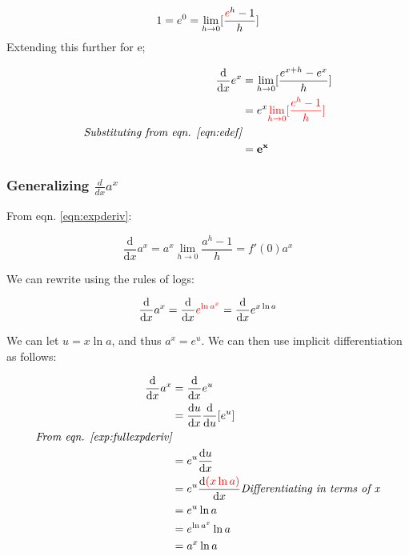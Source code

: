\documentclass[12pt]{article}
\begin{document}
\begin{equation}\label{eqn:edef}
    \begin{split}
        1 = e^0 = \lim_{h\to 0}[\frac{\textcolor{red}{e}^h-1}{h}]
    \end{split}
\end{equation}
Extending this further for e;

\begin{equation}\label{exp:fullexpderiv}
    \begin{split}
        \frac{\text{d}}{\text{d}x} e^x &= \lim_{h\to 0}[\frac{e^{x+h}-e^x}{h}]\\
        &= e^x \textcolor{red}{\lim_{h\to 0}[\frac{e^h-1}{h}]}\\
        \textit{Substituting from eqn. \ref{eqn:edef}}\\
        &= \mathbf{e^x}
    \end{split}
\end{equation}

\subsubsection{Generalizing \texorpdfstring{$\frac{d}{dx} a^x$}{the derivative of exponential functions}}

From eqn. \ref{eqn:expderiv}:

$$\frac{\text{d}}{\text{d}x}a^x = a^x \lim_{h\to 0} \frac{a^h-1}{h} = f'(0) a^x$$

We can rewrite using the rules of logs:

$$\frac{\text{d}}{\text{d}x}a^x = \frac{\text{d}}{\text{d}x}\textcolor{red}{ e^{\ln a^x} } = \frac{\text{d}}{\text{d}x} e^{x\ln a}$$

We can let $u = x \ln a$, and thus $a^x = e^u$. We can then use implicit differentiation as follows:

\begin{equation}\label{exp:derivativeexpa}
    \begin{split}
        \frac{\text{d}}{\text{d}x} a^x &= \frac{\text{d}}{\text{d}x} e^u\\
        &=\frac{\text{d}u}{\text{d}x} \frac{\text{d}}{\text{d}u} [e^u]\\
        \textit{From eqn. \ref{exp:fullexpderiv}}\\
        &=e^u \frac{\text{d}u}{\text{d}x}\\
        &= e^u \frac{\text{d} \textcolor{red}{(x \ln a)}}{\text{d}x}
        \textit{Differentiating in terms of x}\\
        &= e^u \ln a\\
        &= e^{\ln a^x} \ln a\\
        &= a^x \ln a\\
    \end{split}
\end{equation}
\end{document}
